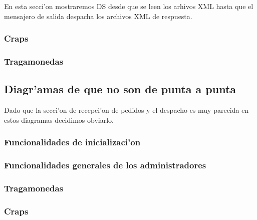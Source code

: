 En esta secci'on mostraremos DS desde que se leen los arhivos XML hasta que el mensajero de salida despacha los archivos XML de respuesta.

\subsubsection{Craps}


\subsubsection{Tragamonedas}



\subsection{Diagr'amas de que no son de punta a punta}
Dado que la secci'on de recepci'on de pedidos y el despacho es muy parecida en estos diagramas decidimos obviarlo.

\subsubsection{Funcionalidades de inicializaci'on}


\subsubsection{Funcionalidades generales de los administradores}


\subsubsection{Tragamonedas}



\subsubsection{Craps}



